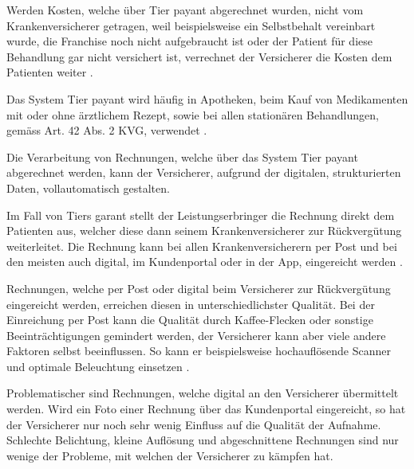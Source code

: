 \documentclass{hwz}
\begin{document}
Werden Kosten, welche über Tier payant abgerechnet wurden, nicht vom Krankenversicherer getragen, weil beispielsweise ein Selbstbehalt vereinbart wurde, die Franchise noch nicht aufgebraucht ist oder der Patient für diese Behandlung gar nicht versichert ist, verrechnet der Versicherer die Kosten dem Patienten weiter \autocite{EidgenossischesDepartementdesInnern2017FaktenblattVergutungssysteme}.

Das System Tier payant wird häufig in Apotheken, beim Kauf von Medikamenten mit oder ohne ärztlichem Rezept, sowie bei allen stationären Behandlungen, gemäss Art. 42 Abs. 2 KVG, verwendet \autocite{EidgenossischesDepartementdesInnern2017FaktenblattVergutungssysteme}.

Die Verarbeitung von Rechnungen, welche über das System Tier payant abgerechnet werden, kann der Versicherer, aufgrund der digitalen, strukturierten Daten, vollautomatisch gestalten.

Im Fall von Tiers garant stellt der Leistungserbringer die Rechnung direkt dem Patienten aus, welcher diese dann seinem Krankenversicherer zur Rückvergütung weiterleitet. Die Rechnung kann bei allen Krankenversicherern per Post und bei den meisten auch digital, im Kundenportal oder in der App, eingereicht werden \autocite{EidgenossischesDepartementdesInnern2017FaktenblattVergutungssysteme}.

Rechnungen, welche per Post oder digital beim Versicherer zur Rückvergütung eingereicht werden, erreichen diesen in unterschiedlichster Qualität. Bei der Einreichung per Post kann die Qualität durch Kaffee-Flecken oder sonstige Beeinträchtigungen gemindert werden, der Versicherer kann aber viele andere Faktoren selbst beeinflussen. So kann er beispielsweise hochauflösende Scanner und optimale Beleuchtung einsetzen  .


Problematischer sind Rechnungen, welche digital an den Versicherer übermittelt werden. Wird ein Foto einer Rechnung über das Kundenportal eingereicht, so hat der Versicherer nur noch sehr wenig Einfluss auf die Qualität der Aufnahme. Schlechte Belichtung, kleine Auflösung und abgeschnittene Rechnungen sind nur wenige der Probleme, mit welchen der Versicherer zu kämpfen hat.
\end{document}
